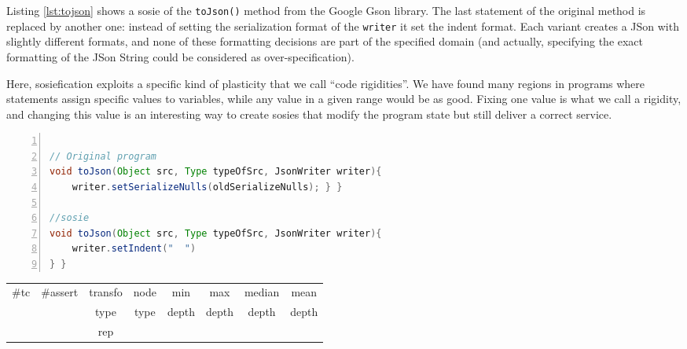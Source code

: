 Listing \ref{lst:tojson} shows a sosie of  the \texttt{toJson()} method from the Google Gson library. 
The last statement of the original method is replaced by another one: instead of setting the serialization format of the \texttt{writer} it set the indent format. 
Each variant creates a JSon with slightly different formats,  and none of these formatting decisions are part of the specified domain (and actually, specifying the exact formatting of the JSon String could be considered as over-specification). 

Here, sosiefication exploits a specific kind of plasticity that we call ``code rigidities''. We have found many regions in programs where statements assign specific values to variables, while any value in a given range would be as good. Fixing one value is what we call a rigidity, and changing this value is an interesting way to create sosies that modify the program state but still deliver a correct service.

\begin{minipage}{\columnwidth}
\begin{lstlisting}[caption={\texttt{toJson} in GSON and a sosie},label={lst:tojson},language=java,numbers=left]

// Original program
void toJson(Object src, Type typeOfSrc, JsonWriter writer){
    writer.setSerializeNulls(oldSerializeNulls); } }

//sosie
void toJson(Object src, Type typeOfSrc, JsonWriter writer){
    writer.setIndent("  ") 
} }
\end{lstlisting}
\tabcolsep=0.11cm
\begin{tabular}{>{\small}c>{\small}c>{\small}c>{\small}c>{\small}c>{\small}c>{\small}c>{\small}c}
\hline
\rowcolor{lightgray} \#tc & \#assert & transfo & node & min & max & median & mean   \\
\rowcolor{lightgray}  & & type & type & depth  & depth & depth & depth  \\ 
\hline
 &  & rep &  &  &  &  & \\
\hline
\end{tabular}
\end{minipage}
